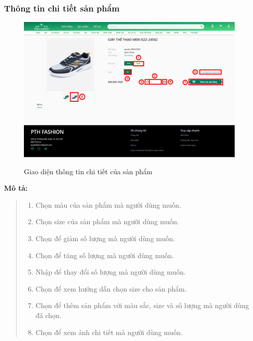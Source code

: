    \subsubsection{Thông tin chi tiết sản phẩm}
    \begin{figure}[!htp]
        \centering
        \includegraphics[width=5in]{img/UI/new_customer/product_detail.png}
        \label{9}
        \newline
        \caption{Giao diện thông tin chi tiết của sản phẩm}
    \end{figure}
    \textbf{Mô tả:}  
    \begin{quote}
        \begin{enumerate}
            \item Chọn màu của sản phẩm mà người dùng muốn.
            \item Chọn size của sản phẩm mà người dùng muốn.
            \item Chọn để giảm số lượng mà người dùng muốn.
            \item Chọn để tăng số lượng mà người dùng muốn.
            \item Nhập để thay đổi số lượng mà người dùng muốn.
            \item Chọn để xem hướng dẫn chọn size cho sản phẩm.
            \item Chọn để thêm sản phẩm với màu sắc, size và số lượng mà người dùng đã chọn.
            \item Chọn để xem ảnh chi tiết mà người dùng muốn.
        \end{enumerate}
    \end{quote}
 
